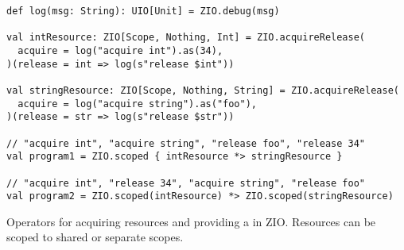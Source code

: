 \begin{algorithm}

\begin{verbatim}
def log(msg: String): UIO[Unit] = ZIO.debug(msg)

val intResource: ZIO[Scope, Nothing, Int] = ZIO.acquireRelease(
  acquire = log("acquire int").as(34),
)(release = int => log(s"release $int"))

val stringResource: ZIO[Scope, Nothing, String] = ZIO.acquireRelease(
  acquire = log("acquire string").as("foo"),
)(release = str => log(s"release $str"))

// "acquire int", "acquire string", "release foo", "release 34"
val program1 = ZIO.scoped { intResource *> stringResource }

// "acquire int", "release 34", "acquire string", "release foo"
val program2 = ZIO.scoped(intResource) *> ZIO.scoped(stringResource)
\end{verbatim}

\caption{Operators for acquiring resources and providing a  in ZIO. Resources can be scoped to shared or separate scopes. \label{zio:scope}}
\end{algorithm}